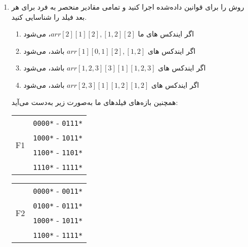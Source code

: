\begin{enumerate}
	\item 
	روش  را برای قوانین داده‌شده اجرا کنید و تمامی مقادیر منحصر به فرد برای هر بعد فیلد را شناسایی کنید.
	\begin{qsolve}
		\begin{enumerate}
			\item 
			اگر ایندکس های ما $ arr[2][1][2],[1,2][2] $،
			 می‌شود
		
		
			\item 
			اگر ایندکس های $ arr[1][0,1][2],[1,2] $ باشد،  می‌شود
			
			
			\item 
			اگر ایندکس های $ arr[1,2,3][3][1][1,2,3] $ باشد،  می‌شود
			
			
			\item 
			اگر ایندکس های $ arr[2,3][1][1,2][1,2] $ باشد،  می‌شود
			
			
		
		\end{enumerate}
		
		همچنین بازه‌های فیلد‌های ما به‌صورت زیر به‌دست می‌آید:
		
		\begin{latin}
			\begin{center}
				\begin{tabular}{|c|c|}
					\hline
					\multirow{4}{*}{F1} & \texttt{0000*} - \texttt{0111*} \\ \cline{2-2}
					& \texttt{1000*} - \texttt{1011*} \\ \cline{2-2}
					& \texttt{1100*} - \texttt{1101*} \\ \cline{2-2}
					& \texttt{1110*} - \texttt{1111*} \\ \hline
				\end{tabular}
			\end{center}
			
			
			\begin{center}
				\begin{tabular}{|c|c|}
					\hline
					\multirow{4}{*}{F2} & \texttt{0000*} - \texttt{0011*} \\ \cline{2-2}
					& \texttt{0100*} - \texttt{0111*} \\ \cline{2-2}
					& \texttt{1000*} - \texttt{1011*} \\ \cline{2-2}
					& \texttt{1100*} - \texttt{1111*} \\ \hline
				\end{tabular}
			\end{center}
			

\end{latin}
\end{qsolve}
\end{enumerate}
